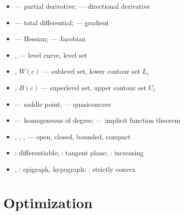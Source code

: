 \begin{itemize}[leftmargin=1.4em,itemsep=0.15ex]
  \item {} --- partial derivative;
         --- directional derivative
  \item {} --- total differential;
         --- gradient
  \item {} --- Hessian;  --- Jacobian
  \item {},  --- level curve, level set
  \item {},  $W(c)$ --- sublevel
        set, lower contour set $L_{c}$
  \item {},  $B(c)$ ---
        superlevel set, upper contour set $U_{c}$
  \item {} --- saddle point;  ---
        quasiconcave
  \item {} --- homogeneous of degree;  --- implicit function theorem
  \item {}, , ,
         --- open, closed, bounded, compact
  \item {}: differentiable; :
        tangent plane; : increasing
  \item {}, : epigraph, hypograph;
        : strictly convex
\end{itemize}

\section*{Optimization}

